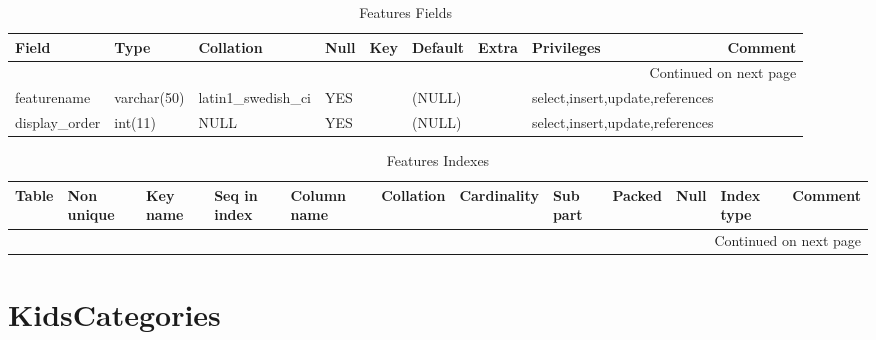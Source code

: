\documentclass[tablesignature,landscape]{scrartcl}
\begin{document}
\begin{longtable}{|l|l|l|l|l|l|l|l|l|}
\caption{Features Fields} \label{tbl:featuresfields}\\
\hline
 Field             &  Type         &  Collation                &  Null  &  Key  &  Default  &  Extra              &  Privileges                       &  Comment \\
\hline
\endhead
\hline\multicolumn{9}{r}{Continued on next page}\
\endfoot
\endlastfoot
\hline
 featureid         &  int(11)      &  NULL                     &        &  PRI  &  (NULL)   &  auto\_{}increment  &  select,insert,update,references  &           \\
 featurename       &  varchar(50)  &  latin1\_{}swedish\_{}ci  &  YES   &       &  (NULL)   &                     &  select,insert,update,references  &           \\
 display\_{}order  &  int(11)      &  NULL                     &  YES   &       &  (NULL)   &                     &  select,insert,update,references  &           \\
\hline
\end{longtable}


\begin{longtable}{|l|l|l|l|l|l|l|l|l|l|l|l|}
\caption{Features Indexes} \label{tbl:featuresindexes}\\
\hline
 Table     &  Non unique  &  Key name  &  Seq in index  &  Column name  &  Collation  &  Cardinality  &  Sub part  &  Packed  &  Null  &  Index type  &  Comment \\
\hline
\endhead
\hline\multicolumn{12}{r}{Continued on next page}\
\endfoot
\endlastfoot
\hline
 Features  &           0  &  PRIMARY   &             1  &  featureid    &  A          &           12  &  (NULL)    &  (NULL)  &        &  BTREE       &           \\
\hline
\end{longtable}
\section{KidsCategories}
\label{sec-4}
\end{document}
